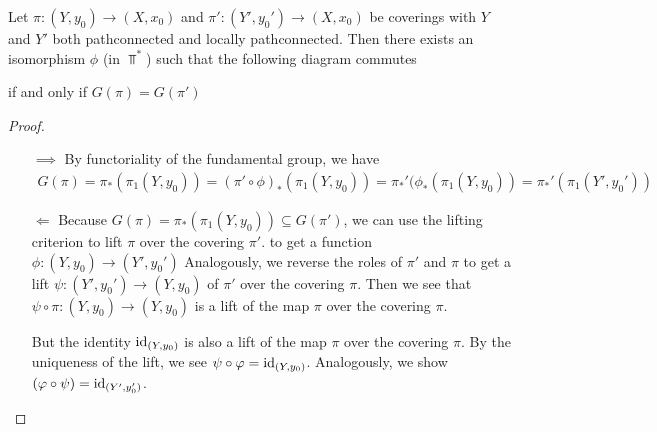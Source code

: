 \begin{cor}\label{cor:uniqueness-theorem}
  Let $\pi:(Y,y_0) \to  (X,x_0)$ and $\pi':(Y',y_0') \to (X,x_0)$ be coverings with $Y$ and $Y'$ both pathconnected and locally pathconnected.
Then there exists an isomorphism $\phi$ (in $\Top^{\ast}$) such that the following diagram commutes
\begin{center}
\end{center}
if and only if $G(\pi) = G(\pi')$
\end{cor}
\begin{proof}
\begin{itemize}
  \item[$\implies$] By functoriality of the fundamental group, we have
    \begin{align*}
      G(\pi) = \pi_{\ast}(\pi_1(Y,y_0)) = (\pi' \circ \phi)_{\ast} (\pi_1(Y,y_0)) = \pi_{\ast}'(\phi_{\ast}(\pi_1(Y,y_0)) = \pi_{\ast}'(\pi_1(Y',y_0'))
    \end{align*}
  \item[$\Leftarrow$] Because $G(\pi) = \pi_{\ast}(\pi_1(Y,y_0)) \subseteq G(\pi')$, we can use the lifting criterion to lift $\pi$ over the covering $\pi'$. to get a function
    $\phi: (Y,y_0) \to (Y',y_0')$
    Analogously, we reverse the roles of $\pi'$ and $\pi$ to get a lift $\psi:(Y',y_0') \to  (Y,y_0)$ of $\pi'$ over the covering $\pi$.
    Then we see that $\psi \circ \pi: (Y,y_0) \to (Y,y_0)$ is a lift of the map $\pi$ over the covering $\pi$.

    But the identity $\operatorname{id}_{(Y,y_0)}$ is also a lift of the map $\pi$ over the covering $\pi$.
    By the uniqueness of the lift, we see $\psi \circ \varphi = \operatorname{id}_{(Y,y_0)}$. Analogously, we show $(\varphi \circ \psi) = \operatorname{id}_{(Y',y_0')}$.
\end{itemize}
\end{proof}

